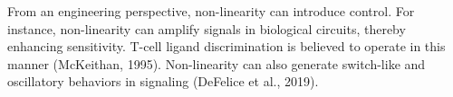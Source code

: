 From an engineering perspective, non-linearity can introduce control. For instance, non-linearity can amplify signals in biological circuits, thereby enhancing sensitivity. T-cell ligand discrimination is believed to operate in this manner (McKeithan, 1995). Non-linearity can also generate switch-like and oscillatory behaviors in signaling (DeFelice et al., 2019).


\begin{centering}


\end{centering}
